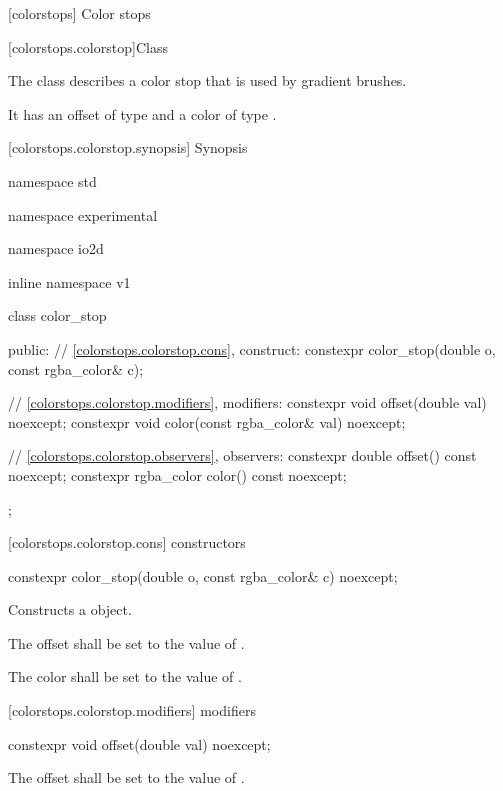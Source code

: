  [colorstops] {Color stops}

 [colorstops.colorstop]{Class }

\pnum
{}
The class  describes a color stop that is used by gradient brushes.

\pnum
It has an offset of type  and a color of type .

 [colorstops.colorstop.synopsis] { Synopsis}

\begin{codeblock}
namespace std { namespace experimental { namespace io2d { inline namespace v1 {
  class color_stop {
  public:
  	// \ref{colorstops.colorstop.cons}, construct:
    constexpr color_stop(double o, const rgba_color& c);
    
    // \ref{colorstops.colorstop.modifiers}, modifiers:
    constexpr void offset(double val) noexcept;
	constexpr void color(const rgba_color& val) noexcept;
	
    // \ref{colorstops.colorstop.observers}, observers:
	constexpr double offset() const noexcept;
	constexpr rgba_color color() const noexcept;
  };
} } } }
\end{codeblock}

 [colorstops.colorstop.cons]{ constructors}

\begin{itemdecl}
	constexpr color_stop(double o, const rgba_color& c) noexcept;
\end{itemdecl}
\begin{itemdescr}
	\pnum
	\effects
	Constructs a  object.
	
	\pnum
	The offset shall be set to the value of .
	
	\pnum
	The color shall be set to the value of .
\end{itemdescr}

 [colorstops.colorstop.modifiers]{ modifiers}

\begin{itemdecl}
	constexpr void offset(double val) noexcept;
\end{itemdecl}
\begin{itemdescr}
	\pnum
	\effects
	The offset shall be set to the value of .
\end{itemdescr}

